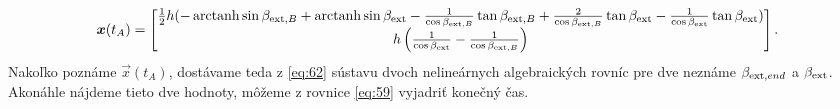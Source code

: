 \documentclass[reqno, a4paper]{amsart}
\numberwithin{equation}{section}
\begin{document}
\begin{align}
 \label{eq:62}
\bm{x}(t_{A})
=
\begin{bmatrix}
    \frac{1}{2}h(-\operatorname{arctanh} \sin 	       \beta_{\mathrm{ext},B} + \operatorname{arctanh} \sin \beta_{\mathrm{ext}} - \frac{1}{\cos \beta_{\mathrm{ext},B}} \tan \beta_{\mathrm{ext},B} + \frac{2}{\cos \beta_{\mathrm{ext},B}} \tan \beta_{\mathrm{ext}} - \frac{1}{\cos \beta_{\mathrm{ext}}} \tan \beta_{\mathrm{ext}}) \\
    h\left(\frac{1}{\cos \beta_{\mathrm{ext}}}-\frac{1}{\cos \beta_{\mathrm{ext},B}}\right)
  \end{bmatrix}.
\end{align}
Nakoľko poznáme $\vec{x}(t_{A})$, dostávame teda z \ref{eq:62} sústavu dvoch nelineárnych algebraických rovníc pre dve neznáme $\beta_{\mathrm{ext},end}$ a $\beta_{\mathrm{ext}}$. Akonáhle nájdeme tieto dve hodnoty, môžeme z rovnice \ref{eq:59} vyjadriť konečný čas.
\end{document}
